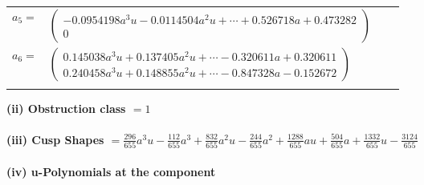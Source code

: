 \documentclass[1p]{elsarticle_modified}
\theoremstyle{definition}
\begin{document}
\begin{tabular}{m{7pt} m{180pt} m{7pt} m{180pt} }
\flushright $a_{5}=$&$\begin{pmatrix}-0.0954198 a^{3} u-0.0114504 a^{2} u+\cdots+0.526718 a+0.473282\\0\end{pmatrix}$ \\
\flushright $a_{6}=$&$\begin{pmatrix}0.145038 a^{3} u+0.137405 a^{2} u+\cdots-0.320611 a+0.320611\\0.240458 a^{3} u+0.148855 a^{2} u+\cdots-0.847328 a-0.152672\end{pmatrix}$\\&\end{tabular}
\flushleft \textbf{(ii) Obstruction class $= 1$}\\~\\
\flushleft \textbf{(iii) Cusp Shapes $= \frac{296}{655} a^3 u-\frac{112}{655} a^3+\frac{832}{655} a^2 u-\frac{244}{655} a^2+\frac{1288}{655} a u+\frac{504}{655} a+\frac{1332}{655} u-\frac{3124}{655}$}\\~\\
\newpage\renewcommand{\arraystretch}{1}
\flushleft \textbf{(iv) u-Polynomials at the component}\newline \\
\end{document}

